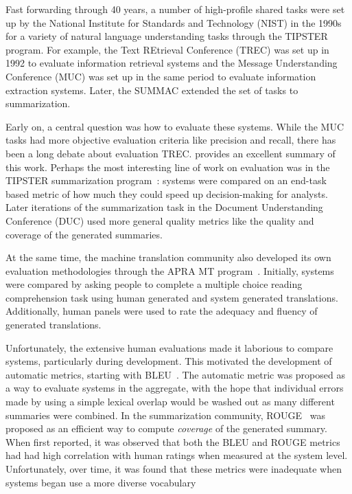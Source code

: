 Fast forwarding through 40 years, a number of high-profile shared tasks were set up by the National Institute for Standards and Technology (NIST) in the 1990s for a variety of natural language understanding tasks through the TIPSTER program.
For example, the Text REtrieval Conference (TREC) was set up in 1992 to evaluate information retrieval systems and the Message Understanding Conference (MUC) was set up in the same period to evaluate information extraction systems.
Later, the SUMMAC extended the set of tasks to summarization.

Early on, a central question was how to evaluate these systems.
While the MUC tasks had more objective evaluation criteria like precision and recall, there has been a long debate about evaluation TREC.\@
\citet{webber2010measurement} provides an excellent summary of this work.
Perhaps the most interesting line of work on evaluation was in the TIPSTER summarization program~\citep{mani1999tipster}:
  systems were compared on an end-task based metric of how much they could speed up decision-making for analysts.
Later iterations of the summarization task in the Document Understanding Conference (DUC) used more general quality metrics like the quality and coverage of the generated summaries.

At the same time, the machine translation community also developed its own evaluation methodologies through the APRA MT program~\citep{white1994arpa}.
Initially, systems were compared by asking people to complete a multiple choice reading comprehension task using human generated and system generated translations.
Additionally, human panels were used to rate the adequacy and fluency of generated translations.

Unfortunately, the extensive human evaluations made it laborious to compare systems, particularly during development.
This motivated the development of automatic metrics, starting with BLEU~\citep{papineni02bleu}.
The automatic metric was proposed as a way to evaluate systems in the aggregate, with the hope that individual errors made by using a simple lexical overlap would be washed out as many different summaries were combined.
In the summarization community, ROUGE~\citep{lin2004rouge} was proposed as an efficient way to compute \textit{coverage} of the generated summary.
When first reported, it was observed that both the BLEU and ROUGE metrics had had high correlation with human ratings when measured at the system level.
Unfortunately, over time, it was found that these metrics were inadequate when systems began use a more diverse vocabulary~\citep{lavie2009meteor,cohan2016revisiting}

